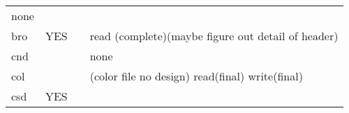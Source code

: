 \begin{longtable}[]{@{}llll@{}}
\begin{minipage}[t]{0.22\columnwidth}
none\strut
\end{minipage}\tabularnewline
\begin{minipage}[t]{0.19\columnwidth}\raggedright
bro\strut
\end{minipage} & \begin{minipage}[t]{0.22\columnwidth}\raggedright
YES\strut
\end{minipage} & \begin{minipage}[t]{0.25\columnwidth}\raggedright
\strut
\end{minipage} & \begin{minipage}[t]{0.22\columnwidth}\raggedright
read (complete)(maybe figure out detail of header)\strut
\end{minipage}\tabularnewline
\begin{minipage}[t]{0.19\columnwidth}\raggedright
cnd\strut
\end{minipage} & \begin{minipage}[t]{0.22\columnwidth}\raggedright
\strut
\end{minipage} & \begin{minipage}[t]{0.25\columnwidth}\raggedright
\strut
\end{minipage} & \begin{minipage}[t]{0.22\columnwidth}\raggedright
none\strut
\end{minipage}\tabularnewline
\begin{minipage}[t]{0.19\columnwidth}\raggedright
col\strut
\end{minipage} & \begin{minipage}[t]{0.22\columnwidth}\raggedright
\strut
\end{minipage} & \begin{minipage}[t]{0.25\columnwidth}\raggedright
\strut
\end{minipage} & \begin{minipage}[t]{0.22\columnwidth}\raggedright
(color file no design) read(final) write(final)\strut
\end{minipage}\tabularnewline
\begin{minipage}[t]{0.19\columnwidth}\raggedright
csd\strut
\end{minipage} & \begin{minipage}[t]{0.22\columnwidth}\raggedright
YES\strut
\end{minipage} & \begin{minipage}[t]{0.25\columnwidth}\raggedright
\strut
\end{minipage} & \begin{minipage}[t]{0.22\columnwidth}\raggedright

\end{minipage}
\end{longtable}
